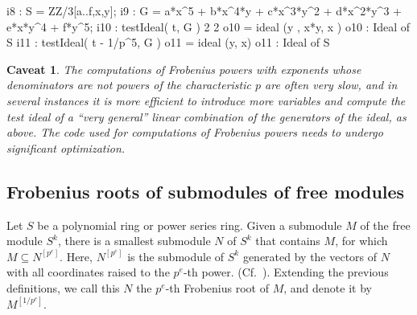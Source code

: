 \documentclass{amsart}
\newcommand{\pedro}[2][]
{\todo[linecolor=blue,backgroundcolor=blue!10,caption={}, #1]{#2}}
\newtheorem*{caveat}{Caveat}
\begin{document}
\medskip
{\small
\begin{MyVerbatim}
i8 : S = ZZ/3[a..f,x,y];
i9 : G = a*x^5 + b*x^4*y + c*x^3*y^2 + d*x^2*y^3 + e*x*y^4 + f*y^5;
i10 : testIdeal( t, G )
              2        2
o10 = ideal (y , x*y, x )
o10 : Ideal of S
i11 : testIdeal( t - 1/p^5, G )
o11 = ideal (y, x)
o11 : Ideal of S
\end{MyVerbatim}
}
\medskip

\begin{caveat}
   The computations of Frobenius powers with exponents whose denominators are not powers of the characteristic $p$ are often very slow, and in several instances it is more efficient to introduce more variables and compute the test ideal of a ``very general'' linear combination of the generators of the ideal, as above.
   The code used for computations of Frobenius powers needs to undergo significant optimization.
\end{caveat}

\subsection{Frobenius  roots of submodules of free modules}

Let $S$ be a polynomial ring or power series ring.
Given a submodule $M$ of the free module $S^k$,
%
%
there is a smallest submodule $N$ of $S^k$ that contains $M$, for which $M\subseteq N^{[p^e]}$.
Here,  $N^{[p^e]}$ is the submodule  of $S^k$ generated by the vectors of $N$ with all coordinates raised to the $p^e$-th power. (Cf.~\cite{KatzmanZhangAlgorithm}).
Extending the previous definitions, 
we call this $N$ the $p^e$-th Frobenius root of $M$, and denote it by $M^{[1/p^e]}$.
\end{document}
